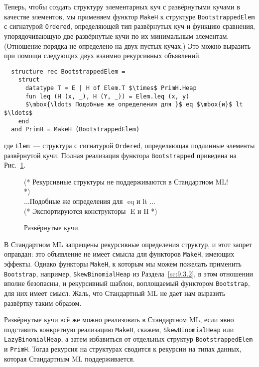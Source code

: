 Теперь, чтобы создать структуру элементарных куч с развёрнутыми кучами
в качестве элементов, мы применяем функтор \lstinline!MakeH! к
структуре \lstinline!BootstrappedElem! с сигнатурой
\lstinline!Ordered!, определяющей тип развёрнутых куч и функцию
сравнения, упорядочивающую две развёрнутые кучи по их минимальным
элементам. (Отношение порядка не определено на двух пустых кучах.) Это
можно выразить при помощи следующих двух взаимно рекурсивных
объявлений.
\begin{lstlisting}
  structure rec BootstrappedElem =
    struct
      datatype T = E | H of Elem.T $\times$ PrimH.Heap
      fun leq (H (x, _), H (Y, _)) = Elem.leq (x, y)
      $\mbox{\ldots Подобные же определения для }$ eq $\mbox{и}$ lt $\ldots$
    end
  and PrimH = MakeH (BootstrappedElem)
\end{lstlisting}
где \lstinline!Elem!~--- структура с сигнатурой \lstinline!Ordered!,
определяющая подлинные элементы развёрнутой кучи.  Полная реализация
функтора \lstinline!Bootstrapped! приведена на Рис.~\ref{fig:10.7}.

\begin{figure}
  \centering
  (* $\mbox{Рекурсивные структуры не поддерживаются в Стандартном ML!}$ *)\\
  $\mbox{\ldots Подобные же определения для }$ eq $\mbox{и}$ lt $\ldots$\\
  (* $\mbox{Экспортируются конструкторы }$ E $\mbox{и}$ H *)\\
  \caption{Развёрнутые кучи.}
  \label{fig:10.7}
\end{figure}

\begin{remark}
  В Стандартном ML запрещены рекурсивные определения структур, и этот
  запрет оправдан: это объявление не имеет смысла для функторов
  \lstinline!MakeH!, имеющих эффекты. Однако функторы
  \lstinline!MakeH!, к которым мы можем пожелать применить
  \lstinline!Bootstrap!, например, \lstinline!SkewBinomialHeap! из
  Раздела~\ref{sc:9.3.2}, в этом отношении вполне безопасны, и
  рекурсивный шаблон, воплощаемый функтором \lstinline!Bootstrap!, для
  них имеет смысл. Жаль, что Стандартный ML не дает нам выразить
  развёртку таким образом.

  Развёрнутые кучи всё же можно реализовать в Стандартном ML, если
  явно подставить конкретную реализацию \lstinline!MakeH!, скажем,
  \lstinline!SkewBinomialHeap! или \lstinline!LazyBinomialHeap!, а
  затем избавиться от отдельных структур \lstinline!BootstrappedElem!
  и \lstinline!PrimH!. Тогда рекурсия на структурах сводится к
  рекурсии на типах данных, которая Стандартным ML  поддерживается.
\end{remark}

